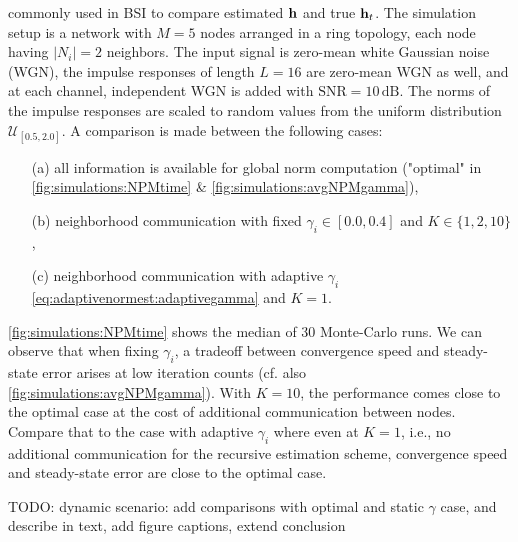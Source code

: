 \documentclass{article}
\begin{document}
commonly used in BSI to compare estimated \(\bm{\mathrm{h}}\) and true \(\bm{\mathrm{h}}_t\).
The simulation setup is a network with \(M=5\) nodes arranged in a ring topology, each node having \(|N_i|=2\) neighbors.
The input signal is zero-mean white Gaussian noise (WGN), the impulse responses of length \(L=16\) are zero-mean WGN as well, and at each channel, independent WGN is added with \(\text{SNR}=10\,\text{dB}\).
The norms of the impulse responses are scaled to random values from the uniform distribution \(\mathcal{U}_{[0.5,2.0]}\).
A comparison is made between the following cases:
\begin{itemize}
    \itemsep-0.2em
    \item[(a)] all information is available for global norm computation ("optimal" in \autoref{fig:simulations:NPMtime} \& \autoref{fig:simulations:avgNPMgamma}),
    \item[(b)] neighborhood communication with fixed \(\gamma_i \in [0.0, 0.4]\) and \(K \in \{1,2,10\}\),
    \item[(c)] neighborhood communication with adaptive \(\gamma_i\) \eqref{eq:adaptivenormest:adaptivegamma} and \(K=1\).
\end{itemize}
\autoref{fig:simulations:NPMtime} shows the median of 30 Monte-Carlo runs.
We can observe that when fixing \(\gamma_i\), a tradeoff between convergence speed and steady-state error arises at low iteration counts (cf. also \autoref{fig:simulations:avgNPMgamma}).
With \(K=10\), the performance comes close to the optimal case at the cost of additional communication between nodes.
Compare that to the case with adaptive \(\gamma_i\) where even at \(K=1\), i.e., no additional communication for the recursive estimation scheme, convergence speed and steady-state error are close to the optimal case.

\begin{todo}
    TODO: dynamic scenario: add comparisons with optimal and static \(\gamma\) case, and describe in text, add figure captions, extend conclusion
\end{todo}

%     
%     
%     
\end{document}
